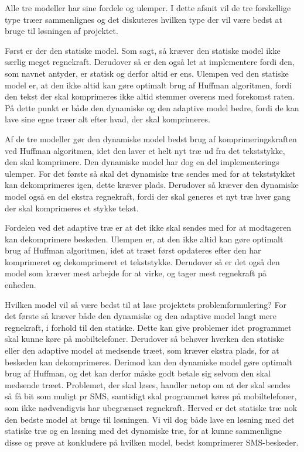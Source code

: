 Alle tre modeller har sine fordele og ulemper. I dette afsnit vil de tre forskellige type træer sammenlignes og det diskuteres hvilken type der vil være bedst at bruge til løsningen af projektet.

Først er der den statiske model. Som sagt, så kræver den statiske model ikke særlig meget regnekraft. Derudover så er den også let at implementere fordi den, som navnet antyder, er statisk og derfor altid er ens. Ulempen ved den statiske model er, at den ikke altid kan gøre optimalt brug af Huffman algoritmen, fordi den tekst der skal komprimeres ikke altid stemmer overens med forekomst raten. På dette punkt er både den dynamiske og den adaptive model bedre, fordi de kan lave sine egne træer alt efter hvad, der skal komprimeres.

Af de tre modeller gør den dynamiske model bedst brug af komprimeringskraften ved Huffman algoritmen, idet den laver et helt nyt træ ud fra det tekststykke, den skal komprimere. Den dynamiske model har dog en del implementerings ulemper. For det første så skal det dynamiske træ sendes med for at tekststykket kan dekomprimeres igen, dette kræver plads. Derudover så kræver den dynamiske model også en del ekstra regnekraft, fordi der skal generes et nyt træ hver gang der skal komprimeres et stykke tekst.

Fordelen ved det adaptive træ er at det ikke skal sendes med for at modtageren kan dekomprimere beskeden. Ulempen er, at den ikke altid kan gøre optimalt brug af Huffman algoritmen, idet at træet først opdateres efter den har komprimeret og dekomprimeret et tekststykke. Derudover så er det også den model som kræver mest arbejde for at virke, og tager mest regnekraft på enheden.

Hvilken model vil så være bedst til at løse projektets problemformulering? For det første så kræver både den dynamiske og den adaptive model langt mere regnekraft, i forhold til den statiske. Dette kan give problemer idet programmet skal kunne køre på mobiltelefoner. Derudover så behøver hverken den statiske eller den adaptive model at medsende træet, som kræver ekstra plads, for at beskeden kan dekomprimeres. Derimod kan den dynamiske model gøre optimalt brug af Huffman, og det kan derfor måske godt betale sig selvom den skal medsende træet. Problemet, der skal løses, handler netop om at der skal sendes så få bit som muligt pr SMS, samtidigt skal programmet køres på mobiltelefoner, som ikke nødvendigvis har ubegrænset regnekraft. Herved er det statiske træ nok den bedste model at bruge til løsningen. Vi vil dog både lave en løsning med det statiske træ og en løsning med det dynamiske træ, for at kunne sammenligne disse og prøve at konkludere på hvilken model, bedst komprimerer SMS-beskeder.